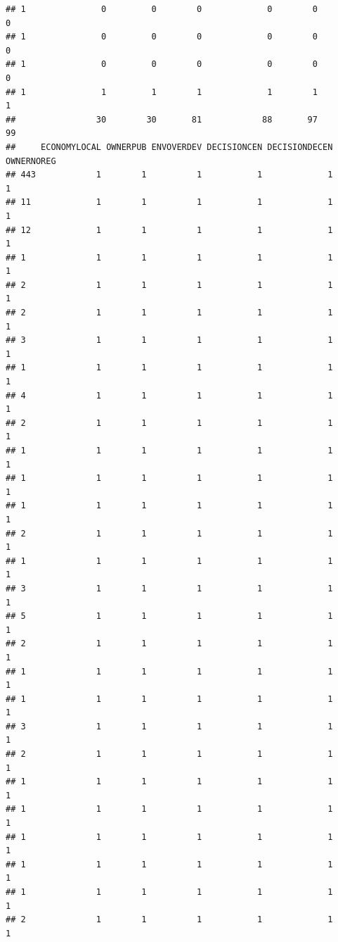 \documentclass[
]{article}
\begin{document}
\begin{verbatim}
## 1               0         0        0             0        0          0
## 1               0         0        0             0        0          0
## 1               0         0        0             0        0          0
## 1               1         1        1             1        1          1
##                30        30       81            88       97         99
##     ECONOMYLOCAL OWNERPUB ENVOVERDEV DECISIONCEN DECISIONDECEN OWNERNOREG
## 443            1        1          1           1             1          1
## 11             1        1          1           1             1          1
## 12             1        1          1           1             1          1
## 1              1        1          1           1             1          1
## 2              1        1          1           1             1          1
## 2              1        1          1           1             1          1
## 3              1        1          1           1             1          1
## 1              1        1          1           1             1          1
## 4              1        1          1           1             1          1
## 2              1        1          1           1             1          1
## 1              1        1          1           1             1          1
## 1              1        1          1           1             1          1
## 1              1        1          1           1             1          1
## 2              1        1          1           1             1          1
## 1              1        1          1           1             1          1
## 3              1        1          1           1             1          1
## 5              1        1          1           1             1          1
## 2              1        1          1           1             1          1
## 1              1        1          1           1             1          1
## 1              1        1          1           1             1          1
## 3              1        1          1           1             1          1
## 2              1        1          1           1             1          1
## 1              1        1          1           1             1          1
## 1              1        1          1           1             1          1
## 1              1        1          1           1             1          1
## 1              1        1          1           1             1          1
## 1              1        1          1           1             1          1
## 2              1        1          1           1             1          1

\end{verbatim}
\end{document}
